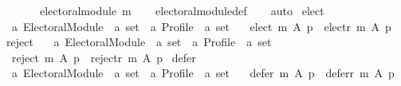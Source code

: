 \begin{isabellebody}
\ \ \ \ \ \ \ electoral{\isacharunderscore}{\kern0pt}module\ m{\isacharparenright}{\kern0pt}{\isachardoublequoteclose}\isanewline
%
\isadelimproof
\ \ %
\endisadelimproof
%
\isatagproof
{}\isamarkupfalse%
\ electoral{\isacharunderscore}{\kern0pt}module{\isacharunderscore}{\kern0pt}def\isanewline
\ \ \isamarkupfalse%
\ auto%
\endisatagproof
{\isafoldproof}%
%
\isadelimproof
\isanewline
%
\endisadelimproof
\isanewline
\isanewline
{}\isamarkupfalse%
\ elect\ {\isacharcolon}{\kern0pt}{\isacharcolon}{\kern0pt}\isanewline
\ \ {\isachardoublequoteopen}{\isacharprime}{\kern0pt}a\ Electoral{\isacharunderscore}{\kern0pt}Module\ {\isasymRightarrow}\ {\isacharprime}{\kern0pt}a\ set\ {\isasymRightarrow}\ {\isacharprime}{\kern0pt}a\ Profile\ {\isasymRightarrow}\ {\isacharprime}{\kern0pt}a\ set{\isachardoublequoteclose}\ \isanewline
\ \ {\isachardoublequoteopen}elect\ m\ A\ p\ {\isasymequiv}\ elect{\isacharunderscore}{\kern0pt}r\ {\isacharparenleft}{\kern0pt}m\ A\ p{\isacharparenright}{\kern0pt}{\isachardoublequoteclose}\isanewline
\isanewline
{}\isamarkupfalse%
\ reject\ {\isacharcolon}{\kern0pt}{\isacharcolon}{\kern0pt}\isanewline
\ \ {\isachardoublequoteopen}{\isacharprime}{\kern0pt}a\ Electoral{\isacharunderscore}{\kern0pt}Module\ {\isasymRightarrow}\ {\isacharprime}{\kern0pt}a\ set\ {\isasymRightarrow}\ {\isacharprime}{\kern0pt}a\ Profile\ {\isasymRightarrow}\ {\isacharprime}{\kern0pt}a\ set{\isachardoublequoteclose}\ \isanewline
\ \ {\isachardoublequoteopen}reject\ m\ A\ p\ {\isasymequiv}\ reject{\isacharunderscore}{\kern0pt}r\ {\isacharparenleft}{\kern0pt}m\ A\ p{\isacharparenright}{\kern0pt}{\isachardoublequoteclose}\isanewline
\isanewline
{}\isamarkupfalse%
\ {\isachardoublequoteopen}defer{\isachardoublequoteclose}\ {\isacharcolon}{\kern0pt}{\isacharcolon}{\kern0pt}\isanewline
\ \ {\isachardoublequoteopen}{\isacharprime}{\kern0pt}a\ Electoral{\isacharunderscore}{\kern0pt}Module\ {\isasymRightarrow}\ {\isacharprime}{\kern0pt}a\ set\ {\isasymRightarrow}\ {\isacharprime}{\kern0pt}a\ Profile\ {\isasymRightarrow}\ {\isacharprime}{\kern0pt}a\ set{\isachardoublequoteclose}\ \isanewline
\ \ {\isachardoublequoteopen}defer\ m\ A\ p\ {\isasymequiv}\ defer{\isacharunderscore}{\kern0pt}r\ {\isacharparenleft}{\kern0pt}m\ A\ p{\isacharparenright}{\kern0pt}{\isachardoublequoteclose}%
\isadelimdocument
%
\endisadelimdocument
%
\isatagdocument
%
\isamarkuptrue%
%
\endisatagdocument

\end{isabellebody}
